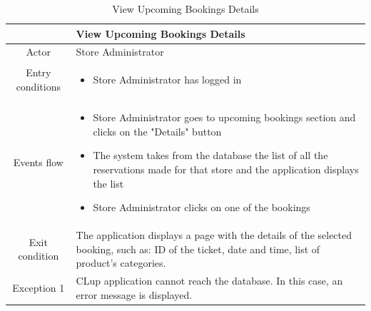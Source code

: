 \documentclass[table, 12pt]{article}
\begin{document}
\begin{longtable}{|c| p{10cm}|}
    \caption{View Upcoming Bookings Details}                                                                                                                             \\
    \hline
                     & View Upcoming Bookings Details                                                                                                                    \\
    \hline
    Actor            & Store Administrator                                                                                                                               \\
    \hline
    Entry conditions & \begin{itemize}
        \item Store Administrator has logged in
    \end{itemize}                                                                                                                        \\
    \hline
    Events flow      & \begin{itemize}[nosep,after=\strut]
        \item Store Administrator goes to upcoming bookings section and clicks on the "Details" button
        \item The system takes from the database the list of all the reservations made for that store and the application displays the list
        \item Store Administrator clicks on one of the bookings
    \end{itemize}                                                                                                                        \\
    \hline
    Exit condition   & The application displays a page with the details of the selected booking, such as: ID of the ticket, date and time, list of product's categories.
    \\
    \hline
    \hline
    Exception 1      & CLup application cannot reach the database. In this case, an error message is displayed.                                                          \\
    \hline
\end{longtable}
\end{document}
